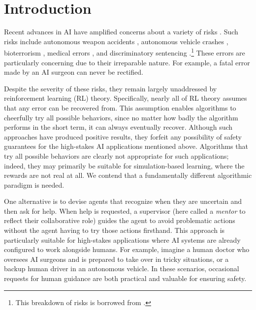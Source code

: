 \section{Introduction}\label{sec:intro}

Recent advances in AI have amplified concerns about a variety of risks \citep{critch2023tasra, hendrycks2023overviewcatastrophicairisks, national_institute_of_standards_and_technology_us_artificial_2024}. Such risks include autonomous weapon accidents \citep{Abaimov2020}, autonomous vehicle crashes \citep{kohli2020enabling}, bioterrorism \citep{mouton2024operational}, medical errors \citep{rajpurkar2022ai}, and discriminatory sentencing \citep{villasenor2020artificial}.\footnote{This breakdown of risks is borrowed from \citet{plaut_avoiding_2024}.} These errors are particularly concerning due to their irreparable nature. For example, a fatal error made by an AI surgeon can never be rectified.


Despite the severity of these risks, they remain largely unaddressed by reinforcement learning (RL) theory. Specifically, nearly all of RL theory assumes that any error can be recovered from. This assumption enables algorithms to cheerfully try all possible behaviors, since no matter how badly the algorithm performs in the short term, it can always eventually recover. Although such approaches have produced positive results, they forfeit any possibility of safety guarantees for the high-stakes AI applications mentioned above. Algorithms that try all possible behaviors are clearly not appropriate for such applications; indeed, they may primarily be suitable for simulation-based learning, where the rewards are not real at all. We contend that a fundamentally different algorithmic paradigm is needed.


One alternative is to devise agents that recognize when they are uncertain and then ask for help. When help is requested, a supervisor (here called a \emph{mentor} to reflect their collaborative role) guides the agent to avoid problematic actions without the agent having to try those actions firsthand. This approach is particularly suitable for high-stakes applications where AI systems are already configured to work alongside humans. For example, imagine a human doctor who oversees AI surgeons and is prepared to take over in tricky situations, or a backup human driver in an autonomous vehicle. In these scenarios, occasional requests for human guidance are both practical and valuable for ensuring safety.

